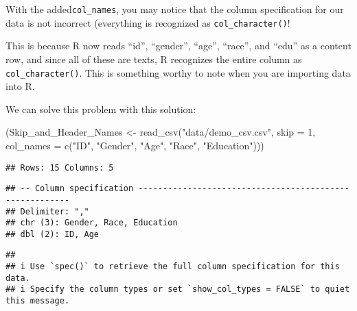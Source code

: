\documentclass[
]{book}
\newenvironment{Shaded}{\begin{snugshade}}{\end{snugshade}}
\newcommand{\AttributeTok}[1]{\textcolor[rgb]{0.77,0.63,0.00}{#1}}
\newcommand{\DecValTok}[1]{\textcolor[rgb]{0.00,0.00,0.81}{#1}}
\newcommand{\FunctionTok}[1]{\textcolor[rgb]{0.00,0.00,0.00}{#1}}
\newcommand{\NormalTok}[1]{#1}
\newcommand{\OtherTok}[1]{\textcolor[rgb]{0.56,0.35,0.01}{#1}}
\newcommand{\StringTok}[1]{\textcolor[rgb]{0.31,0.60,0.02}{#1}}
\begin{document}
With the added\texttt{col\_names}, you may notice that the column specification for our data is not incorrect (everything is recognized as \texttt{col\_character()}!

This is because R now reads ``id'', ``gender'', ``age'', ``race'', and ``edu'' as a content row, and since all of these are texts, R recognizes the entire column as \texttt{col\_character()}. This is something worthy to note when you are importing data into R.

We can solve this problem with this solution:

\begin{Shaded}
\begin{Highlighting}[]
\NormalTok{(Skip\_and\_Header\_Names }\OtherTok{\textless{}{-}} \FunctionTok{read\_csv}\NormalTok{(}\StringTok{"data/demo\_csv.csv"}\NormalTok{, }
                                  \AttributeTok{skip =} \DecValTok{1}\NormalTok{,}
                                  \AttributeTok{col\_names =} \FunctionTok{c}\NormalTok{(}\StringTok{"ID"}\NormalTok{, }\StringTok{"Gender"}\NormalTok{, }\StringTok{"Age"}\NormalTok{, }\StringTok{"Race"}\NormalTok{, }\StringTok{"Education"}\NormalTok{)))}
\end{Highlighting}
\end{Shaded}

\begin{verbatim}
## Rows: 15 Columns: 5
\end{verbatim}

\begin{verbatim}
## -- Column specification --------------------------------------------------------
## Delimiter: ","
## chr (3): Gender, Race, Education
## dbl (2): ID, Age
\end{verbatim}

\begin{verbatim}
##
## i Use `spec()` to retrieve the full column specification for this data.
## i Specify the column types or set `show_col_types = FALSE` to quiet this message.
\end{verbatim}
\end{document}
